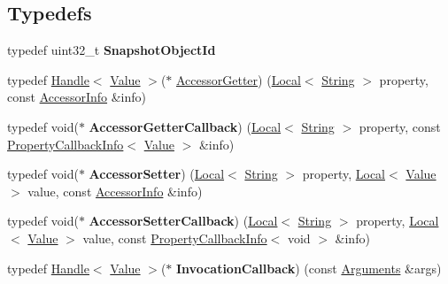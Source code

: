\subsection*{Typedefs}
\begin{DoxyCompactItemize}
\item 
\hypertarget{namespacev8_acc05be0fdcf26b26fbb410e75a048e63}{}typedef uint32\+\_\+t {\bfseries Snapshot\+Object\+Id}\label{namespacev8_acc05be0fdcf26b26fbb410e75a048e63}

\item 
typedef \hyperlink{classv8_1_1_handle}{Handle}$<$ \hyperlink{classv8_1_1_value}{Value} $>$($\ast$ \hyperlink{namespacev8_a3016fe071826349d1370a700e71be094}{Accessor\+Getter}) (\hyperlink{classv8_1_1_local}{Local}$<$ \hyperlink{classv8_1_1_string}{String} $>$ property, const \hyperlink{classv8_1_1_accessor_info}{Accessor\+Info} \&info)
\item 
\hypertarget{namespacev8_a722613c87061708a4f1aa050d095f868}{}typedef void($\ast$ {\bfseries Accessor\+Getter\+Callback}) (\hyperlink{classv8_1_1_local}{Local}$<$ \hyperlink{classv8_1_1_string}{String} $>$ property, const \hyperlink{classv8_1_1_property_callback_info}{Property\+Callback\+Info}$<$ \hyperlink{classv8_1_1_value}{Value} $>$ \&info)\label{namespacev8_a722613c87061708a4f1aa050d095f868}

\item 
\hypertarget{namespacev8_a6bf0ccffe563bf71d01828b3512705ed}{}typedef void($\ast$ {\bfseries Accessor\+Setter}) (\hyperlink{classv8_1_1_local}{Local}$<$ \hyperlink{classv8_1_1_string}{String} $>$ property, \hyperlink{classv8_1_1_local}{Local}$<$ \hyperlink{classv8_1_1_value}{Value} $>$ value, const \hyperlink{classv8_1_1_accessor_info}{Accessor\+Info} \&info)\label{namespacev8_a6bf0ccffe563bf71d01828b3512705ed}

\item 
\hypertarget{namespacev8_a926da9728efe528d193a6d36f004777e}{}typedef void($\ast$ {\bfseries Accessor\+Setter\+Callback}) (\hyperlink{classv8_1_1_local}{Local}$<$ \hyperlink{classv8_1_1_string}{String} $>$ property, \hyperlink{classv8_1_1_local}{Local}$<$ \hyperlink{classv8_1_1_value}{Value} $>$ value, const \hyperlink{classv8_1_1_property_callback_info}{Property\+Callback\+Info}$<$ void $>$ \&info)\label{namespacev8_a926da9728efe528d193a6d36f004777e}

\item 
\hypertarget{namespacev8_aa1cc8187a527d2cd85d6e4908c0a0513}{}typedef \hyperlink{classv8_1_1_handle}{Handle}$<$ \hyperlink{classv8_1_1_value}{Value} $>$($\ast$ {\bfseries Invocation\+Callback}) (const \hyperlink{classv8_1_1_arguments}{Arguments} \&args)\label{namespacev8_aa1cc8187a527d2cd85d6e4908c0a0513}


\end{DoxyCompactItemize}
